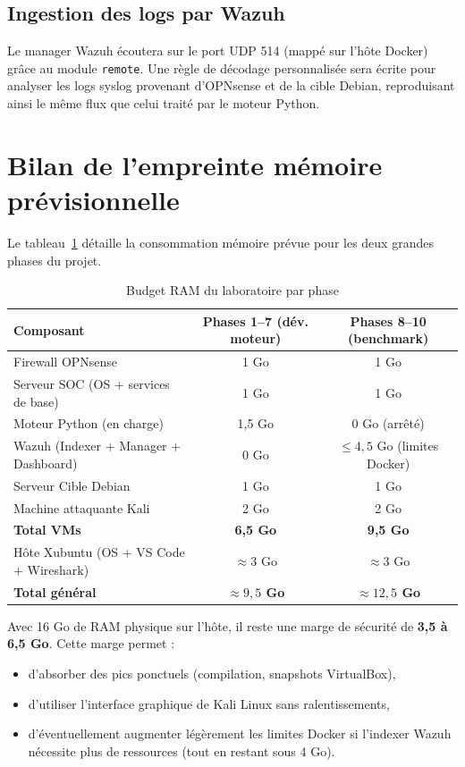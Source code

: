 \documentclass[12pt,a4paper]{article}
\begin{document}
\subsection{Ingestion des logs par Wazuh}

Le manager Wazuh écoutera sur le port UDP 514 (mappé sur l'hôte Docker) grâce au module \texttt{remote}. Une règle de décodage personnalisée sera écrite pour analyser les logs syslog provenant d'OPNsense et de la cible Debian, reproduisant ainsi le même flux que celui traité par le moteur Python.

\section{Bilan de l'empreinte mémoire prévisionnelle}

Le tableau~\ref{tab:ram-budget} détaille la consommation mémoire prévue pour les deux grandes phases du projet.

\begin{table}[H]
\centering
\caption{Budget RAM du laboratoire par phase}
\label{tab:ram-budget}
\begin{tabular}{|l|c|c|}
\hline
\textbf{Composant} & \textbf{Phases 1–7 (dév. moteur)} & \textbf{Phases 8–10 (benchmark)} \\
\hline
Firewall OPNsense       & 1 Go  & 1 Go  \\
Serveur SOC (OS + services de base) & 1 Go  & 1 Go  \\
Moteur Python (en charge) & 1,5 Go & 0 Go (arrêté) \\
Wazuh (Indexer + Manager + Dashboard) & 0 Go  & $\leq 4,5$ Go (limites Docker) \\
Serveur Cible Debian    & 1 Go  & 1 Go  \\
Machine attaquante Kali & 2 Go  & 2 Go  \\
\hline
\textbf{Total VMs}      & \textbf{6,5 Go} & \textbf{9,5 Go} \\
Hôte Xubuntu (OS + VS Code + Wireshark) & $\approx 3$ Go & $\approx 3$ Go \\
\hline
\textbf{Total général}  & \textbf{$\approx 9,5$ Go} & \textbf{$\approx 12,5$ Go} \\
\hline
\end{tabular}
\end{table}

Avec 16 Go de RAM physique sur l'hôte, il reste une marge de sécurité de \textbf{3,5 à 6,5 Go}. Cette marge permet :
\begin{itemize}
    \item d'absorber des pics ponctuels (compilation, snapshots VirtualBox),
    \item d'utiliser l'interface graphique de Kali Linux sans ralentissements,
    \item d'éventuellement augmenter légèrement les limites Docker si l'indexer Wazuh nécessite plus de ressources (tout en restant sous 4 Go).
\end{itemize}
\end{document}
